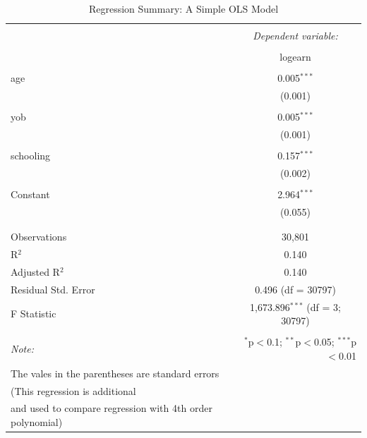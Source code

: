 \documentclass[a4paper,12pt,oneside,English]{article}
\begin{document}
\begin{table}[!htbp] \centering 
  \caption{Regression Summary: A Simple OLS Model} 
  \label{reg 2} 
\begin{tabular}{@{\extracolsep{5pt}}lc} 
\\[-1.8ex]\hline 
\hline \\[-1.8ex] 
 & \multicolumn{1}{c}{\textit{Dependent variable:}} \\ 
\cline{2-2} 
\\[-1.8ex] & logearn \\ 
\hline \\[-1.8ex] 
 age & 0.005$^{***}$ \\ 
  & (0.001) \\ 
  & \\ 
 yob & 0.005$^{***}$ \\ 
  & (0.001) \\ 
  & \\ 
 schooling & 0.157$^{***}$ \\ 
  & (0.002) \\ 
  & \\ 
 Constant & 2.964$^{***}$ \\ 
  & (0.055) \\ 
  & \\ 
\hline \\[-1.8ex] 
Observations & 30,801 \\ 
R$^{2}$ & 0.140 \\ 
Adjusted R$^{2}$ & 0.140 \\ 
Residual Std. Error & 0.496 (df = 30797) \\ 
F Statistic & 1,673.896$^{***}$ (df = 3; 30797) \\ 
\hline 
\hline \\[-1.8ex] 
\textit{Note:}  & \multicolumn{1}{r}{$^{*}$p$<$0.1; $^{**}$p$<$0.05; $^{***}$p$<$0.01} \\ The vales in the parentheses are standard errors\\(This regression is additional \\and used to compare regression with 4th order polynomial)
\end{tabular} 
\end{table} 
\end{document}
